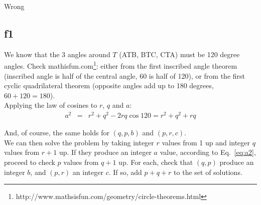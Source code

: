 \documentclass[english]{article}
\begin{document}
Wrong

\subsection{f1}

We know that the 3 angles around $T$ (ATB, BTC, CTA) must be 120 degree angles. Check mathisfun.com\footnote{http://www.mathsisfun.com/geometry/circle-theorems.html}: either from the first inscribed angle theorem (inscribed angle is half of the central angle, 60 is half of 120), or from the first cyclic quadrilateral theorem (opposite angles add up to 180 degrees, $60 + 120 = 180$).\\

Applying the law of cosines to $r$, $q$ and $a$:\\

\begin{eqnarray}
a^2 &=& r^2 + q^2 - 2 r q \cos{120} = r^2 + q^2 + r q \label{eq:a2}
\end{eqnarray}

And, of course, the same holds for $(q,p,b)$ and $(p,r,c)$.\\

We can then solve the problem by taking integer $r$ values from 1 up and integer $q$ values from $r+1$ up. If they produce an integer $a$ value, according to Eq.~\ref{eq:a2}, proceed to check $p$ values from $q+1$ up. For each, check that $(q,p)$ produce an integer $b$, and $(p,r)$ an integer $c$. If so, add $p+q+r$ to the set of solutions.
\end{document}
